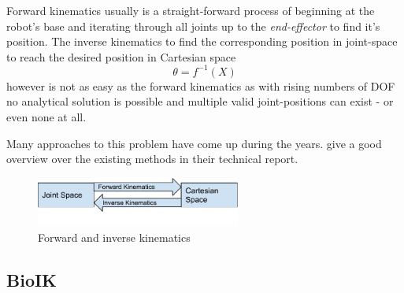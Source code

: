 Forward kinematics usually is a straight-forward process of beginning at the robot's base and iterating through all joints up to the \textit{end-effector} to find it's position. The inverse kinematics to find the corresponding position in joint-space to reach the desired position in Cartesian space
\begin{equation*}
\theta = f^{-1}(X)
\end{equation*}
however is not as easy as the forward kinematics as with rising numbers of DOF no analytical solution is possible and multiple valid joint-positions can exist - or even none at all\cite{DextquotesingleSouza}.

Many approaches to this problem have come up during the years. \citeauthor{andreasaristidou2009inverse} give a good overview over the existing methods in their technical report\cite{DextquotesingleSouza}.

\begin{figure}
	\caption{Forward and inverse kinematics\label{fig:basics:kinematics}}
	\begin{center}
		\includegraphics[width=0.6\textwidth]{assets/chpt_basics/Kinematics.pdf}
	\end{center}
\end{figure}

\subsection{BioIK}